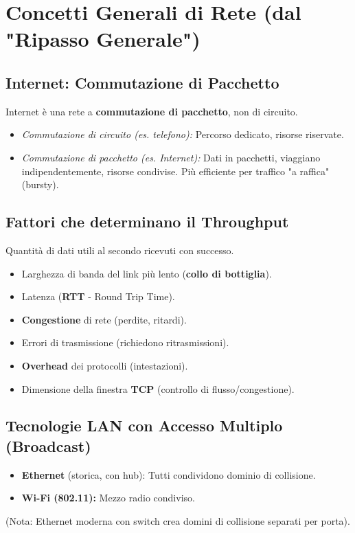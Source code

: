 \section{Concetti Generali di Rete (dal "Ripasso Generale")}

\subsection{Internet: Commutazione di Pacchetto}
Internet è una rete a \textbf{commutazione di pacchetto}, non di circuito.
\begin{itemize}
    \item \textit{Commutazione di circuito (es. telefono):} Percorso dedicato, risorse riservate.
    \item \textit{Commutazione di pacchetto (es. Internet):} Dati in pacchetti, viaggiano indipendentemente, risorse condivise. Più efficiente per traffico "a raffica" (bursty).
\end{itemize}

\subsection{Fattori che determinano il Throughput}
Quantità di dati utili al secondo ricevuti con successo.
\begin{itemize}
    \item Larghezza di banda del link più lento (\textbf{collo di bottiglia}).
    \item Latenza (\textbf{RTT} - Round Trip Time).
    \item \textbf{Congestione} di rete (perdite, ritardi).
    \item Errori di trasmissione (richiedono ritrasmissioni).
    \item \textbf{Overhead} dei protocolli (intestazioni).
    \item Dimensione della finestra \textbf{TCP} (controllo di flusso/congestione).
\end{itemize}

\subsection{Tecnologie LAN con Accesso Multiplo (Broadcast)}
\begin{itemize}
    \item \textbf{Ethernet} (storica, con hub): Tutti condividono dominio di collisione.
    \item \textbf{Wi-Fi (802.11):} Mezzo radio condiviso.
\end{itemize}
(Nota: Ethernet moderna con switch crea domini di collisione separati per porta).

